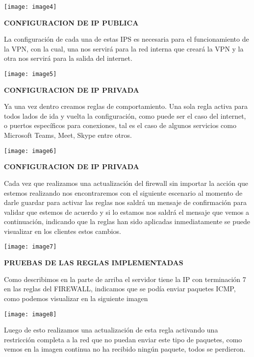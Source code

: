 \texttt{[image: image4]}



\textbf{CONFIGURACION DE IP PUBLICA}

La configuraci\'{o}n de cada una de estas IPS es necesaria para el funcionamiento de la VPN, con la cual, una nos servir\'{a} para la red interna que crear\'{a} la VPN y la otra nos servir\'{a} para la salida del internet.



\texttt{[image: image5]}

\textbf{}

\textbf{}

\textbf{CONFIGURACION DE IP PRIVADA}

Ya una vez dentro creamos reglas de comportamiento. Una sola regla activa para todos lados de ida y vuelta la configuraci\'{o}n, como puede ser el caso del internet, o puertos espec\'{i}ficos para conexiones, tal es el caso de algunos servicios como Microsoft Teams, Meet, Skype entre otros.  



\texttt{[image: image6]}



\textbf{CONFIGURACION DE IP PRIVADA}

Cada vez que realizamos una actualizaci\'{o}n del firewall sin importar la acci\'{o}n que estemos realizando nos encontraremos con el siguiente escenario al momento de darle guardar para activar las reglas nos saldr\'{a} un mensaje de confirmaci\'{o}n para validar que estemos de acuerdo y si lo estamos nos saldr\'{a} el mensaje que vemos a continuaci\'{o}n, indicando que la reglas han sido aplicadas inmediatamente se puede visualizar en los clientes estos cambios.

\texttt{[image: image7]}

\textbf{PRUEBAS DE LAS REGLAS IMPLEMENTADAS }

Como describimos en la parte de arriba el servidor tiene la IP con terminaci\'{o}n 7 en las reglas del FIREWALL, indicamos que se pod\'{i}a enviar paquetes ICMP, como podemos visualizar en la siguiente imagen



\texttt{[image: image8]}

Luego de esto realizamos una actualizaci\'{o}n de esta regla activando una restricci\'{o}n completa a la red que no puedan enviar este tipo de paquetes, como vemos en la imagen continua no ha recibido ning\'{u}n paquete, todos se perdieron.

